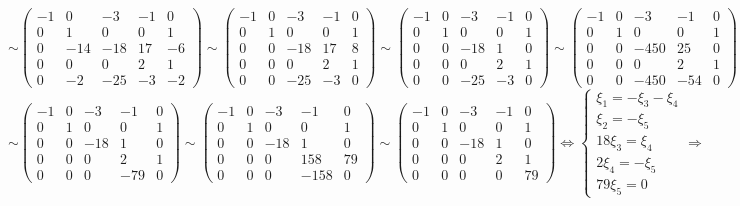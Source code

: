 \documentclass{article}
\begin{document}
$$\sim \begin{pmatrix}
-1 & 0 & -3 & -1 & 0 \\
0 & 1 & 0 & 0 & 1 \\
0 & -14 & -18 & 17 & -6 \\
0 & 0 & 0 & 2 & 1 \\
0 & -2 & -25 & -3 & -2
\end{pmatrix} \sim \begin{pmatrix}
-1 & 0 & -3 & -1 & 0 \\
0 & 1 & 0 & 0 & 1 \\
0 & 0 & -18 & 17 & 8 \\
0 & 0 & 0 & 2 & 1 \\
0 & 0 & -25 & -3 & 0
\end{pmatrix} \sim \begin{pmatrix}
-1 & 0 & -3 & -1 & 0 \\
0 & 1 & 0 & 0 & 1 \\
0 & 0 & -18 & 1 & 0 \\
0 & 0 & 0 & 2 & 1 \\
0 & 0 & -25 & -3 & 0
\end{pmatrix} \sim \begin{pmatrix}
-1 & 0 & -3 & -1 & 0 \\
0 & 1 & 0 & 0 & 1 \\
0 & 0 & -450 & 25 & 0 \\
0 & 0 & 0 & 2 & 1 \\
0 & 0 & -450 & -54 & 0
\end{pmatrix} \sim$$
$$ \sim \begin{pmatrix}
-1 & 0 & -3 & -1 & 0 \\
0 & 1 & 0 & 0 & 1 \\
0 & 0 & -18 & 1 & 0 \\
0 & 0 & 0 & 2 & 1 \\
0 & 0 & 0 & -79 & 0
\end{pmatrix} \sim \begin{pmatrix}
-1 & 0 & -3 & -1 & 0 \\
0 & 1 & 0 & 0 & 1 \\
0 & 0 & -18 & 1 & 0 \\
0 & 0 & 0 & 158 & 79 \\
0 & 0 & 0 & -158 & 0
\end{pmatrix} \sim \begin{pmatrix}
-1 & 0 & -3 & -1 & 0 \\
0 & 1 & 0 & 0 & 1 \\
0 & 0 & -18 & 1 & 0 \\
0 & 0 & 0 & 2 & 1 \\
0 & 0 & 0 & 0 & 79
\end{pmatrix} \Leftrightarrow \begin{cases}
\xi_1 = -\xi_3-\xi_4 \\
\xi_2 = -\xi_5 \\
18\xi_3 = \xi_4 \\
2\xi_4 = -\xi_5 \\
79\xi_5 = 0
\end{cases} \Rightarrow$$
\end{document}
